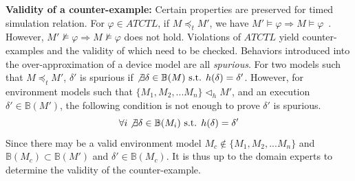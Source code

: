 \textbf{Validity of a counter-example: }
Certain properties are preserved for timed simulation relation. For $\varphi\in ATCTL$, if $M\preceq_t M'$, we have $M'\models \varphi\Rightarrow M\models\varphi$~\cite{CEGAR}. However, $M'\not\models \varphi\Rightarrow M\not\models\varphi$ does not hold. Violations of $ATCTL$ yield \textsf{counter-examples} and the validity of which need to be checked.
Behaviors introduced into the over-approximation of a device model are all \emph{spurious}.
For two models such that $M\preceq_t M'$, $\delta'$ is spurious if $\not\exists \delta\in\mathbb{B}(M) \text{ s.t. }h(\delta)=\delta'$.
However, for environment models such that $\{M_1,M_2,...M_n\}\triangleleft_h M'$, and an execution $\delta'\in\mathbb{B}(M')$, the following condition is not enough to prove $\delta'$ is spurious.
$$\forall i\not\exists \delta\in\mathbb{B}(M_i)\text{ s.t. }h(\delta)=\delta'$$
Since there may be a valid environment model $M_c\not\in\{M_1,M_2,...M_n\}$ and $\mathbb{B}(M_c)\subset\mathbb{B}(M')$ and $\delta'\in\mathbb{B}(M_c)$. 
It is thus up to the domain experts to determine the validity of the counter-example.
%
